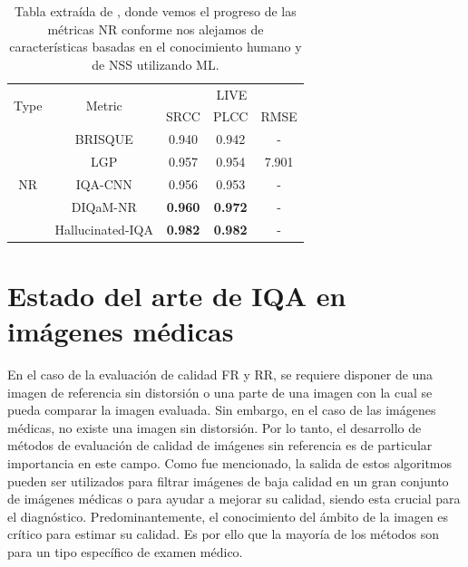 \begin{table}[htp]
  \tiny
    \centering
    \begin{tabular}{|c|c|c|c|c|}
    \hline 
    \multirow{2}{*}{Type} & \multirow{2}{*}{Metric} & \multicolumn{3}{c|}{LIVE}\\
    \cline{3-5}
                          & & SRCC & PLCC & RMSE \\
    \hline
    \multirow{5}{*}{NR} & 
                           BRISQUE \cite{BRISQUE} & 0.940 & 0.942 & - \\
                          & LGP \cite{LGP} & 0.957 & 0.954 & 7.901 \\
                          & IQA-CNN \cite{IQA-CNN} & 0.956 & 0.953 & - \\
                          & DIQaM-NR \cite{DIQaM} & \textbf{0.960} & \textbf{0.972} & - \\
                          & Hallucinated-IQA \cite{Hallucinated-IQA} & \textbf{0.982} & \textbf{0.982} & - \\
                          \hline
  \end{tabular}
  \caption[Tablas estado del arte NR-IQA]{Tabla extraída de \cite{SurveyOf2D3DMetrics}, donde vemos el progreso de las métricas NR 
  conforme nos alejamos de características basadas en el conocimiento humano y de NSS utilizando ML.}
  \label{tab:SOTANRIQA}
\end{table}

\section{Estado del arte de IQA en imágenes médicas}

En el caso de la evaluación de calidad FR y RR, se requiere disponer 
de una imagen de referencia sin distorsión o una parte de una imagen con la cual 
se pueda comparar la imagen evaluada. Sin embargo, en el caso de las imágenes médicas, 
no existe una imagen sin distorsión\cite{DicomDistortionsExample}. 
Por lo tanto, el desarrollo de métodos de evaluación de calidad de imágenes 
sin referencia es de particular importancia en este campo\cite{LGP, BRISQUE, IQA-CNN, DIQaM, Hallucinated-IQA}.
Como fue mencionado, la salida de estos algoritmos pueden ser utilizados 
para filtrar imágenes de baja calidad en un gran conjunto de imágenes médicas o 
para ayudar a mejorar su calidad, siendo esta crucial para el diagnóstico\cite{DicomDistortionsExample}.
Predominantemente, el conocimiento del ámbito de la imagen es crítico para estimar 
su calidad. Es por ello que la mayoría de los métodos son para un tipo específico 
de examen médico.

